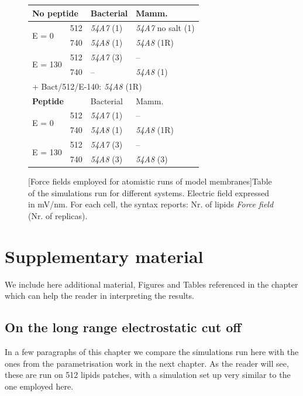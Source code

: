 \begin{figure}[h]%
\centering
 \def\arraystretch{1.6}
\begin{tabular}{ll|l|l}
\hline
 \multicolumn{2}{l|}{\textbf{No peptide}} & Bacterial & Mamm. \\
 \hline
 \multirow{2}{*}{E = 0} & 512 & \emph{54A7} (1) & \emph{54A7} no salt (1) \\
 & 740 & \emph{54A8} (1) & \emph{54A8} (1R) \\
 \hline
 \multirow{2}{*}{E = 130} & 512 & \emph{54A7} (3) & -- \\
 & 740 & -- & \emph{54A8} (1) \\
 \hline
 \multicolumn{4}{l}{+ Bact/512/E-140: \emph{54A8} (1R)} \\
 \hline
 \multicolumn{2}{l|}{\textbf{Peptide}} & Bacterial & Mamm. \\
 \hline
 \multirow{2}{*}{E = 0} & 512 & \emph{54A7} (1) & -- \\
 & 740 & \emph{54A8} (1) & \emph{54A8} (1R) \\
 \hline
 \multirow{2}{*}{E = 130} & 512 & \emph{54A7} (3) & -- \\
 & 740 & \emph{54A8} (3) & \emph{54A8} (3) \\
 \hline
 \end{tabular}
[Force fields employed for atomistic runs of model membranes]{Table of the simulations run for different systems. Electric field expressed in mV/nm. For each cell, the syntax reports: Nr. of lipids \emph{Force field} (Nr. of replicas).}
\label{table:membrane_simulations_force_field}
\end{figure}


\section{Supplementary material} \label{sec:ch3_SI}

We include here additional material, Figures and Tables referenced in the chapter which can help the reader in interpreting the results.


\subsection{On the long range electrostatic cut off}
In a few paragraphs of this chapter we compare the simulations run here with the ones from the parametrisation work in the next chapter. As the reader will see, these are run on 512 lipids patches, with a simulation set up very similar to the one employed here.

